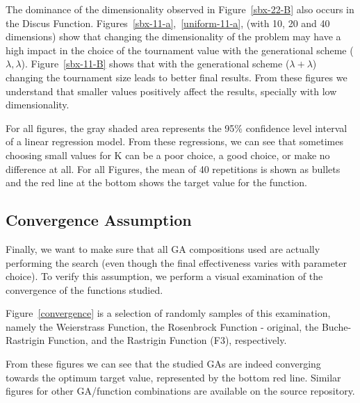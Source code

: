 The dominance of the dimensionality observed in Figure~\ref{sbx-22-B}
also occurs in the Discus Function.
Figures~\ref{sbx-11-a},~\ref{uniform-11-a}, (with 10, 20 and 40
dimensions) show that changing the dimensionality of the problem may
have a high impact in the choice of the tournament value with the
generational scheme ($\lambda, \lambda$). Figure~\ref{sbx-11-B} shows
that with the generational scheme ($\lambda + \lambda$) changing the
tournament size leads to better final results. From these figures we
understand that smaller values positively affect the results,
specially with low dimensionality.

For all figures, the gray shaded area represents the 95\% confidence
level interval of a linear regression model. From these regressions,
we can see that sometimes choosing small values for K can be a poor
choice, a good choice, or make no difference at all. For all Figures,
the mean of 40 repetitions is shown as bullets and the red line at the
bottom shows the target value for the function.


\subsection{Convergence Assumption}

Finally, we want to make sure that all GA compositions used are actually
performing the search (even though the final effectiveness varies with
parameter choice). To verify this assumption, we perform a
visual examination of the convergence of the functions studied. 

Figure~\ref{convergence} is a selection of randomly samples of this
examination, namely the Weierstrass Function, the Rosenbrock Function
- original, the Buche-Rastrigin Function, and the Rastrigin Function
(F3), respectively.

From these figures we can see that the studied GAs are indeed
converging towards the optimum target value, represented by the bottom
red line. Similar figures for other GA/function combinations are
available on the source repository.

